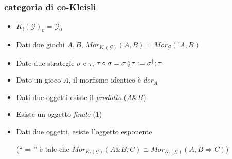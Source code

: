 \documentclass{beamer}
\begin{document}
\begin{frame}
\frametitle{categoria di co-Kleisli}
	\begin{itemize}
		\item<3-> $K_!(\mathcal{G})_0 = \mathcal{G}_0$
		\item<4-> Dati due giochi $A,B$, $Mor_{K_!(\mathcal{G})}(A,B) = Mor_{\mathcal{G}}(!A,B)$
		\item<5-> Date due strategie $\sigma$ e $\tau$, $\tau \circ \sigma = \sigma \fatsemi \tau := \sigma ^\dag ; \tau$
		\item<6-> Dato un gioco $A$, il morfismo identico è $der_A$
	\end{itemize}

	\begin{itemize}
		\item<8-> Dati due oggetti esiste il \emph{prodotto} ($A\& B$)
		\item<9-> Esiste un oggetto \emph{finale} ($1$)
		\item<10-> Dati due oggetti, esiste l'oggetto esponente 
		
		(``$\Rightarrow$'' è tale che $Mor_{K_!(\mathcal{G})}(A\& B,C) \cong Mor_{K_!(\mathcal{G})}(A,B\Rightarrow C)$)
	\end{itemize}

\end{frame}
\end{document}

